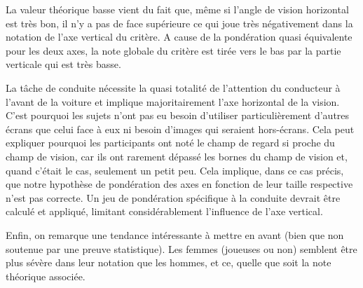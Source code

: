 	\par La valeur théorique basse vient du fait que, même si l'angle de vision horizontal est très bon, il n'y a pas de face supérieure ce qui joue très négativement dans la notation de l'axe vertical du critère. A cause de la pondération quasi équivalente pour les deux axes, la note globale du critère est tirée vers le bas par la partie verticale qui est très basse.
	
	\par La tâche de conduite nécessite la quasi totalité de l'attention du conducteur à l'avant de la voiture et implique majoritairement l'axe horizontal de la vision. C'est pourquoi les sujets n'ont pas eu besoin d'utiliser particulièrement d'autres écrans que celui face à eux ni besoin d'images qui seraient hors-écrans. Cela peut expliquer pourquoi les participants ont noté le champ de regard si proche du champ de vision, car ils ont rarement dépassé les bornes du champ de vision et, quand c'était le cas, seulement un petit peu. Cela implique, dans ce cas précis, que notre hypothèse de pondération des axes en fonction de leur taille respective n'est pas correcte. Un jeu de pondération spécifique à la conduite devrait être calculé et appliqué, limitant considérablement l'influence de l'axe vertical.
	
	\par Enfin, on remarque une tendance intéressante à mettre en avant (bien que non soutenue par une preuve statistique). Les femmes (joueuses ou non) semblent être plus sévère dans leur notation que les hommes, et ce, quelle que soit la note théorique associée.